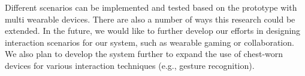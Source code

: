 Different scenarios can be implemented and tested based on the prototype with multi wearable devices. There are also a number of ways this research could be extended. In the future, we would like to further develop our efforts in designing interaction scenarios for our system, such as wearable gaming or collaboration. We also plan to develop the system further to expand the use of chest-worn devices for various interaction techniques (e.g., gesture recognition).
